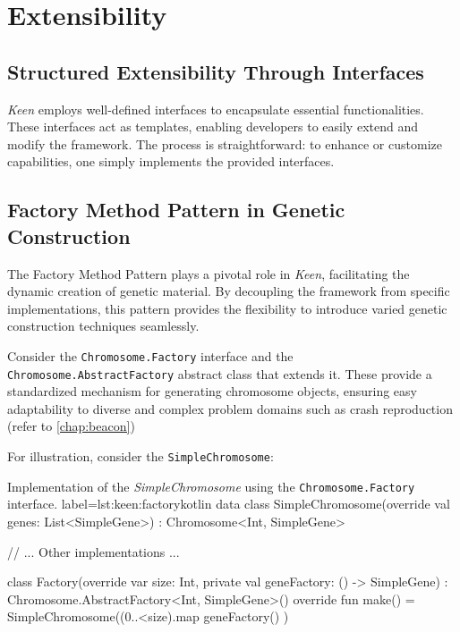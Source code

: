 \section{Extensibility}
\label{sec:keen:extensibility}

    \subsection{Structured Extensibility Through Interfaces}
        \textit{Keen} employs well-defined interfaces to encapsulate essential functionalities. These interfaces act as 
        templates, enabling developers to easily extend and modify the framework. The process is straightforward: to 
        enhance or customize capabilities, one simply implements the provided interfaces.

    \subsection{Factory Method Pattern in Genetic Construction}
        The Factory Method Pattern plays a pivotal role in \textit{Keen}, facilitating the dynamic creation of genetic 
        material. By decoupling the framework from specific implementations, this pattern provides the flexibility to 
        introduce varied genetic construction techniques seamlessly.

        Consider the \texttt{Chromosome.Factory} interface and the \texttt{Chromosome.AbstractFactory} abstract class
        that extends it. These provide a standardized mechanism for generating chromosome objects, ensuring
        easy adaptability to diverse and complex problem domains such as crash reproduction (refer to 
        \vref{chap:beacon})

        For illustration, consider the \texttt{SimpleChromosome}:

        \begin{code}{
        Implementation of the \textit{SimpleChromosome} using the 
        \texttt{Chromosome.Factory} interface.
        }{label=lst:keen:factory}{kotlin}
        data class SimpleChromosome(override val genes: List<SimpleGene>) :
            Chromosome<Int, SimpleGene> {
            // ... Other implementations ...

            class Factory(override var size: Int, private val geneFactory: () -> SimpleGene) :
                Chromosome.AbstractFactory<Int, SimpleGene>() {
                override fun make() = SimpleChromosome((0..<size).map { geneFactory() })
            }
        }
        \end{code}

